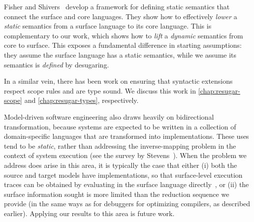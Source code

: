 Fisher and Shivers~\cite{ziggurat} develop a framework
for defining static semantics that connect the
surface and core languages. They show how to effectively \emph{lower}
a \emph{static} semantics from a surface language to its core
language. This is complementary to our work, which
shows how to \emph{lift} a \emph{dynamic} semantics from core to surface.
This exposes a fundamental difference in starting assumptions:
they assume the surface language has a static semantics, while we assume
its semantics is \emph{defined} by desugaring.

In a similar vein, there has been work on ensuring that syntactic
extensions respect scope rules and are type sound. We discuss this
work in \cref{chap:resugar-scope} and \cref{chap:resugar-types},
respectively.

Model-driven software engineering also draws heavily on
bidirectional transformation, because systems are expected to be written
in a collection of domain-specific languages that are transformed into
implementations. These uses tend to be \emph{static}, rather
than addressing the inverse-mapping problem in the context of system
execution (see the survey by
Stevens~\cite{bidirectional-model-transfs}).
When the problem we address does arise in this area, it is typically the
case that either (i) both the source and target models have
implementations, so that surface-level execution traces can be obtained
by evaluating in the surface language directly~\cite{Perera-slicing}, or
(ii) the surface information sought is more limited than the reduction
sequence we provide (in the same ways as for debuggers for optimizing
compilers, as described earlier).
Applying our results to this area is future work.
